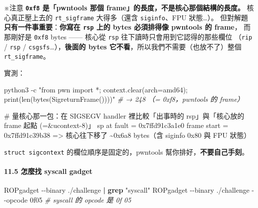 \documentclass[10pt,a4paper]{article}
\newenvironment{Shaded}{\begin{snugshade}}{\end{snugshade}}
\newcommand{\AttributeTok}[1]{\textcolor[rgb]{0.13,0.29,0.53}{#1}}
\newcommand{\CommentTok}[1]{\textcolor[rgb]{0.56,0.35,0.01}{\textit{#1}}}
\newcommand{\ExtensionTok}[1]{#1}
\newcommand{\FunctionTok}[1]{\textcolor[rgb]{0.13,0.29,0.53}{\textbf{#1}}}
\newcommand{\KeywordTok}[1]{\textcolor[rgb]{0.13,0.29,0.53}{\textbf{#1}}}
\newcommand{\NormalTok}[1]{#1}
\newcommand{\StringTok}[1]{\textcolor[rgb]{0.31,0.60,0.02}{#1}}
\renewenvironment{Shaded}{%
  \def\FrameCommand{\fboxsep=3.2pt\colorbox{shadecolor}}%
  \MakeFramed{\advance\hsize-\width\FrameRestore\small}%
}{%
  \endMakeFramed
}
\renewenvironment{quote}{%
  \begin{mdframed}[linewidth=0pt,innerleftmargin=0pt,innerrightmargin=0pt,
    innerbottommargin=0pt,innertopmargin=0pt,skipabove=0.55em,skipbelow=0.55em,
    leftmargin=0.9em,rightmargin=0.4em,startcode={\color{quotebar}\vrule width 2.6pt},%
    endcode={}]%
  \itshape\color{black}%
}{%
  \end{mdframed}%
}
\begin{document}
\begin{quote}
※注意 \textbf{\texttt{0xf8} 是「pwntools 那個
frame」的長度，不是核心那個結構的長度。} 核心真正壓上去的
\texttt{rt\_\allowbreak{}sigframe} 大得多（還含 \texttt{siginfo}、FPU 狀態\ldots）。
但對解題\textbf{只有一件事重要}：\textbf{你寫在 \texttt{rsp} 上的 bytes
必須排得像 pwntools 的 frame}， 而那剛好是 \texttt{0xf8} bytes ------
核心從 \texttt{rsp} 往下讀時只會用到它認得的那些欄位 （\texttt{rip} /
\texttt{rsp} / \texttt{csgsfs}\ldots），\textbf{後面的 bytes
它不看}，所以我們不需要（也放不了）整個 \texttt{rt\_\allowbreak{}sigframe}。

實測：

\begin{Shaded}
\begin{Highlighting}[]
\ExtensionTok{python3} \AttributeTok{{-}c} \StringTok{"from pwn import *; context.clear(arch=\textquotesingle{}amd64\textquotesingle{}); print(len(bytes(SigreturnFrame())))"}
\CommentTok{\# → 248   （= 0xf8，pwntools 的 frame）}
\end{Highlighting}
\end{Shaded}

\begin{Shaded}
\begin{Highlighting}[]
\NormalTok{\# 量核心那一包：在 SIGSEGV handler 裡比較「出事時的 rsp」與「核心放的 frame 起點 (=\&ucontext{-}8)」}
\NormalTok{sp at fault = 0x7ffd91c3a1e0    frame start = 0x7ffd91c39b38}
\NormalTok{=\textgreater{} 核心往下移了 \textasciitilde{}0x6a8 bytes（含 siginfo 0x80 與 FPU 狀態）}
\end{Highlighting}
\end{Shaded}
\end{quote}

\texttt{struct\ \allowbreak{}sigcontext} 的欄位順序是固定的，pwntools
幫你排好，\textbf{不要自己手刻}。

\paragraph{11.5 怎麼找 syscall
gadget}\label{ux600eux9ebcux627e-syscall-gadget}

\begin{Shaded}
\begin{Highlighting}[]
\ExtensionTok{ROPgadget} \AttributeTok{{-}{-}binary}\NormalTok{ ./challenge }\KeywordTok{|} \FunctionTok{grep} \StringTok{"syscall"}
\ExtensionTok{ROPgadget} \AttributeTok{{-}{-}binary}\NormalTok{ ./challenge }\AttributeTok{{-}{-}opcode}\NormalTok{ 0f05     }\CommentTok{\# syscall 的 opcode 是 0f 05}
\end{Highlighting}
\end{Shaded}
\end{document}
